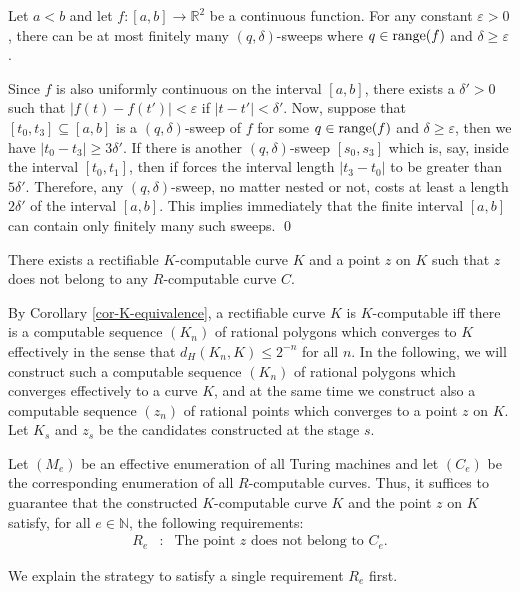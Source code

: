 \documentclass{LMCS}
\theoremstyle{plain}
\def\IN{\mathbb{N}}
\def\IR{\mathbb{R}}
\newcommand{\rang}{\mbox{\rm range}}
\begin{document}
\begin{lem}\label{lem-sweep}
Let $a<b$ and let $f:[a,b] \to \IR^2$ be a continuous function. For any constant $\varepsilon>0$, there can be at most finitely many $(q,\delta)$-sweeps where $q\in \rang(f)$ and $\delta\ge \varepsilon$.
\end{lem}

\proof
Since $f$ is also uniformly continuous on the interval $[a, b]$, there exists a $\delta' >0$ such that $|f(t)-f(t')| < \varepsilon$ if $|t-t'|< \delta'$. Now, suppose that $[t_0, t_3]\subseteq [a,b]$  is a $(q, \delta)$-sweep of $f$ for some $q\in \rang(f)$ and  $\delta \ge \varepsilon$, then we have $|t_0 -t_3| \ge 3\delta'$. If there is another $(q, \delta)$-sweep $[s_0, s_3]$ which is, say, inside the interval $[t_0, t_1]$, then if forces the interval length $|t_3-t_0|$ to be greater than $5\delta'$. Therefore, any $(q, \delta)$-sweep, no matter nested or not,  costs at least a length $2\delta'$ of the interval $[a,b]$.  This implies immediately that the finite interval $[a,b]$ can contain only finitely many such sweeps.
\qed


\begin{thm}\label{Thm-K-R-sep}
There exists a rectifiable $K$-computable curve $K$ and a point $z$ on $K$ such that $z$ does not belong to any $R$-computable curve $C$.
\end{thm}
\proof By Corollary \ref{cor-K-equivalence}, a rectifiable curve $K$ is $K$-computable iff there is a computable sequence $(K_n)$ of rational polygons which converges to $K$ effectively in the sense that $d_H(K_n, K) \le 2^{-n}$ for all $n$. In the following, we will construct such a computable sequence $(K_n)$ of rational polygons which converges effectively to a curve $K$, and at the same time we construct also a computable sequence $(z_n)$ of rational points which converges to a point $z$ on $K$. Let $K_s$ and $z_s$ be the candidates  constructed at the stage $s$.

Let $(M_e)$ be an effective enumeration of all Turing machines and let $(C_e)$ be the corresponding enumeration of all $R$-computable curves. Thus, it suffices to guarantee that the constructed $K$-computable curve $K$ and the point $z$ on $K$ satisfy, for all $e\in\IN$, the following requirements:
\begin{eqnarray*}
  R_e &:& \mbox{The point $z$ does not belong to $C_e$}.
 \end{eqnarray*}

We explain the strategy to satisfy a single requirement $R_e$ first.
\end{document}
